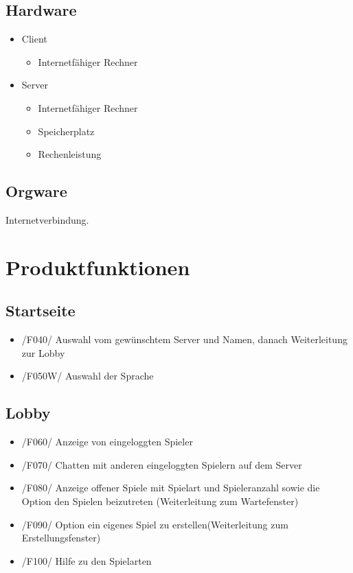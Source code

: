 \documentclass{article}
\begin{document}
\subsection{Hardware}
\begin{itemize}
		\item \gls{Client}
		\begin{itemize}
			\item Internetfähiger Rechner
		\end{itemize}
		\item Server
		\begin{itemize}
			\item Internetfähiger Rechner	
			\item Speicherplatz
			\item Rechenleistung
		\end{itemize}
	\end{itemize}

\subsection{Orgware}
Internetverbindung.

\section{Produktfunktionen}
\subsection{Startseite}
\begin{itemize}
	\item /F040/ Auswahl vom gewünschtem \gls{Server} und Namen, danach Weiterleitung zur \gls{Lobby}
	\item /F050W/ Auswahl der Sprache
\end{itemize}

\subsection{\gls{Lobby}}
\begin{itemize}
	\item /F060/ Anzeige von eingeloggten Spieler
	\item /F070/ Chatten mit anderen eingeloggten Spielern auf dem \gls{Server}
	\item /F080/ Anzeige offener Spiele mit Spielart und Spieleranzahl sowie die Option den Spielen beizutreten (Weiterleitung zum \gls{Wartefenster})
	\item /F090/ Option ein eigenes Spiel zu erstellen(Weiterleitung zum \gls{Erstellungsfenster})
	\item /F100/ Hilfe zu den Spielarten
\end{itemize}
\end{document}
